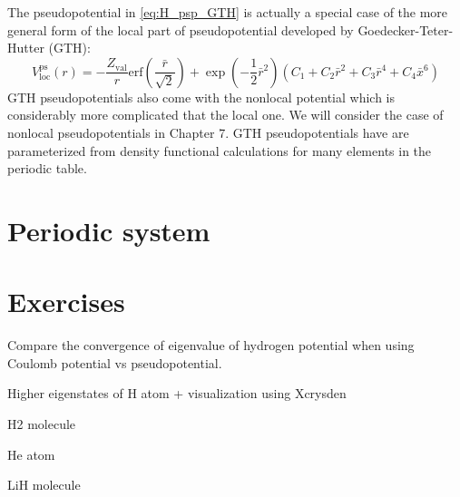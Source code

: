 The pseudopotential in \ref{eq:H_psp_GTH} is actually a special case of the more general
form of the local part of pseudopotential developed by Goedecker-Teter-Hutter (GTH):
\begin{equation}
V^{\mathrm{ps}}_{\mathrm{loc}}(r) = -\frac{Z_{\mathrm{val}}}{r}
\mathrm{erf}\left( \frac{\bar{r}}{\sqrt{2}} \right) +
\exp\left( -\frac{1}{2}\bar{r}^2 \right)
\left( C_{1} + C_{2}\bar{r}^2 + C_{3}\bar{r}^4 + C_{4}\bar{x}^6\right)
\label{eq:V_loc_GTH}
\end{equation}
GTH pseudopotentials also come with the nonlocal potential which is considerably more complicated
that the local one.
We will consider the case of nonlocal pseudopotentials in Chapter 7.
GTH pseudopotentials have are parameterized from density functional calculations for many elements
in the periodic table. 


\section{Periodic system}


\section{Exercises}

Compare the convergence of eigenvalue of hydrogen potential when using Coulomb potential
vs pseudopotential.

Higher eigenstates of H atom + visualization using Xcrysden

H2 molecule

He atom

LiH molecule